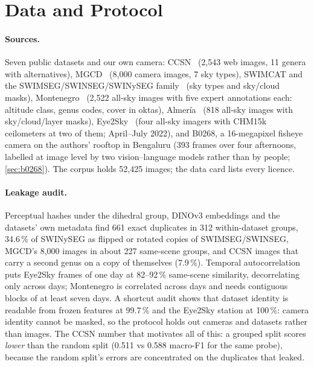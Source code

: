 \section{Data and Protocol}
\label{sec:data}

\paragraph{Sources.} Seven public datasets and our own camera: CCSN~\cite{zhang2018cloudnet} (2,543 web images,
11 genera with alternatives), MGCD~\cite{liu2020mgcd} (8,000 camera images, 7 sky types), SWIMCAT and the
SWIMSEG/SWINSEG/SWINySEG family~\cite{dev2017colorbased} (sky types and sky/cloud masks), Montenegro~\cite{montenegro2025}
(2,522 all-sky images with five expert annotations each: altitude class, genus codes, cover in oktas),
Almer\'ia~\cite{almeria2025} (818 all-sky images with sky/cloud/layer masks), Eye2Sky~\cite{eye2sky} (four all-sky
imagers with CHM15k ceilometers at two of them; April--July 2022), and B0268, a 16-megapixel fisheye camera on
the authors' rooftop in Bengaluru (393 frames over four afternoons, labelled at image level by two
vision--language models rather than by people; \cref{sec:b0268}). The corpus holds 52,425 images; the data card
lists every licence.

\paragraph{Leakage audit.} Perceptual hashes under the dihedral group, DINOv3 embeddings and the datasets' own
metadata find 661 exact duplicates in 312 within-dataset groups, 34.6\,\% of SWINySEG as flipped or rotated copies
of SWIMSEG/SWINSEG, MGCD's 8,000 images in about 227 same-scene groups, and CCSN images that carry a second genus
on a copy of themselves (7.9\,\%). Temporal autocorrelation puts Eye2Sky frames of one day at 82--92\,\% same-scene
similarity, decorrelating only across days; Montenegro is correlated across days and needs contiguous blocks of at
least seven days. A shortcut audit shows that dataset identity is readable from frozen features at 99.7\,\% and
the Eye2Sky station at 100\,\%: camera identity cannot be masked, so the protocol holds out cameras and datasets
rather than images. The CCSN number that motivates all of this: a grouped split scores \emph{lower} than the random
split (0.511 vs 0.588 macro-F1 for the same probe), because the random split's errors are concentrated on the
duplicates that leaked.

